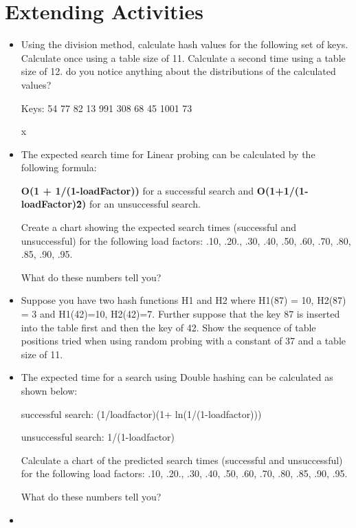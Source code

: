  \section{Extending Activities}
\begin{itemize}


\item {
Using the division method, calculate hash values for the following set 
       of keys. Calculate once using a table size of 11. Calculate a second 
       time using a table size of 12. do you notice anything about the 
       distributions of the calculated values?



Keys: 54 77 82 13 991 308 68 45 1001 73

}
x
\item {
     The expected search time for Linear probing can be calculated by the following formula:
   
\textbf{ O(1 + 1/(1-loadFactor)) } for a successful search and \textbf{O(1+1/(1-loadFactor)\^2)}  for an unsuccessful search.
     
     Create a chart showing the expected search times (successful and unsuccessful) for the following load factors: .10, .20., .30, .40, .50, .60, .70, .80, .85, .90, .95.
     
     What do these numbers tell you?

}
\item {

     Suppose you have two hash functions H1 and H2  where H1(87) = 10, H2(87) = 3  and  H1(42)=10, H2(42)=7.
     Further suppose that the key 87 is inserted into the table first and then the key of 42.  Show the sequence of table positions tried when using random probing with a constant of 37 and a table size of 11.
     
}
\item {

The expected time for a search using Double hashing can be calculated as shown below:

successful search:  (1/loadfactor)(1+ ln(1/(1-loadfactor))) 

unsuccessful search:  1/(1-loadfactor) 
     
     Calculate a chart of the predicted search times (successful and unsuccessful) for the following load factors: .10, .20., .30, .40, .50, .60, .70, .80, .85, .90, .95.
     
     What do these numbers tell you?
}

\item {

}
\end{itemize}

